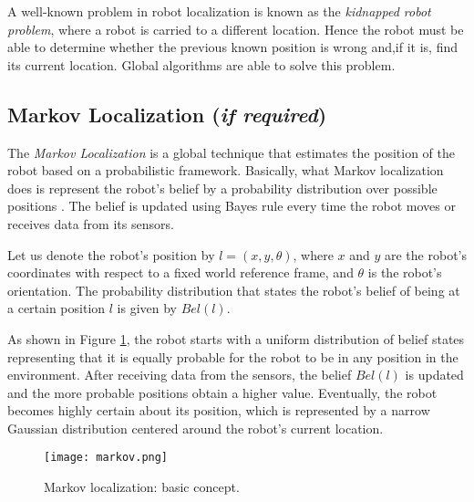 A well-known problem in robot localization is known as the \textit{kidnapped robot problem}, where a robot is carried to a different location. Hence the robot must be able to determine whether the previous known position is wrong and,if it is, find its current location. Global algorithms are able to solve this problem. 

\subsection{Markov Localization (\textit{if required})}

The \textit{Markov Localization} is a global technique that estimates the position of the robot based on a probabilistic framework. Basically, what Markov localization does is represent the robot's belief by a probability distribution over possible positions \citep{Montecarlo}. The belief is updated using Bayes rule every time the robot moves or receives data from its sensors. 

Let us denote the robot's position by  $l=(x,y,\theta)$, where $x$ and $y$ are the robot's coordinates with respect to a fixed world reference frame, and $\theta$ is the robot's orientation. The probability distribution that states the robot's belief of being at a certain position $l$ is given by $Bel(l)$.

As shown in Figure \ref{fig:markov}, the robot starts with a uniform distribution of belief states representing that it is equally probable for the robot to be in any position in the environment. After receiving data from the sensors, the belief $Bel(l)$ is updated and the more probable positions obtain a higher value. Eventually, the robot becomes highly certain about its position, which is represented by a narrow Gaussian distribution centered around the robot's current location.

\begin{figure}[H]
	\centering
	\texttt{[image: markov.png]}
	\vspace{-10pt}
	\caption[Markov localization: basic concept.]{Markov localization: basic concept. \citep[chap. 2, page 393]{Markov}}
	\vspace{-15pt}
	\label{fig:markov}
\end{figure}

